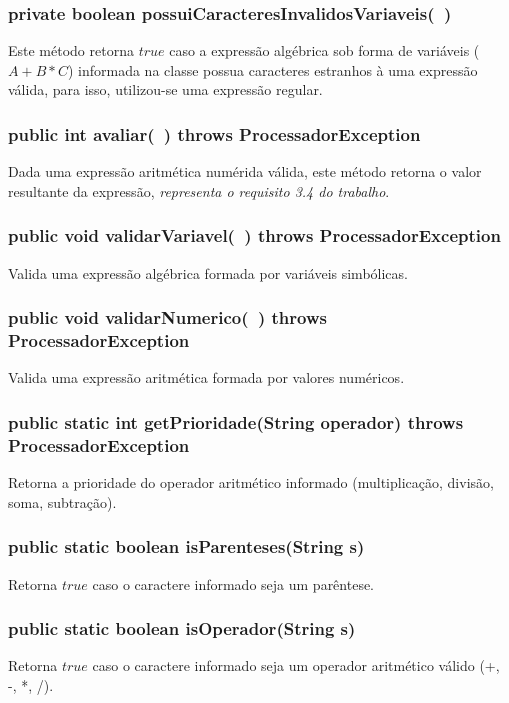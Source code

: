 \documentclass[a4paper,11pt]{article}
\begin{document}
\subsubsection{private boolean possuiCaracteresInvalidosVariaveis(\ )}
Este método retorna \emph{$true$} caso a expressão algébrica sob forma de variáveis (\(A+B*C\)) informada na classe possua caracteres estranhos à uma expressão válida, para isso, utilizou-se uma expressão regular. 

\subsubsection{public int avaliar(\ ) throws ProcessadorException}
Dada uma expressão aritmética numérida válida, este método retorna o valor resultante da expressão,  \emph{representa o requisito 3.4 do trabalho}.

\subsubsection{public void validarVariavel(\ ) throws ProcessadorException}
Valida uma expressão algébrica formada por variáveis simbólicas.

\subsubsection{public void validarNumerico(\ ) throws ProcessadorException}
Valida uma expressão aritmética formada por valores numéricos.

\subsubsection{public static int getPrioridade(String operador) throws ProcessadorException}
Retorna a prioridade do operador aritmético informado (multiplicação, divisão, soma, subtração).

\subsubsection{public static boolean isParenteses(String s)}
Retorna \emph{$true$} caso o caractere informado seja um parêntese.

\subsubsection{public static boolean isOperador(String s)}
Retorna \emph{$true$} caso o caractere informado seja um operador aritmético válido (+, -, *, /).
\end{document}
